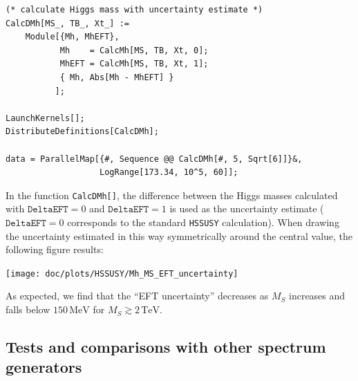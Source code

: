 \documentclass[final,3p,11pt,pdflatex]{elsarticle}
\makeatletter
\newcommand{\modelname}[1]{\texttt{#1}\@\xspace}
\newcommand{\HSSUSY}{\modelname{HSSUSY}}
\newcommand{\code}[1]{\lstinline|#1|}  %
\newcommand{\unit}[1]{\,\text{#1}}      %
\newcommand{\MS}{\ensuremath{M_S}\xspace}
\makeatother
\begin{document}
\begin{example}[label=ex:HSSUSY_EFT_uncertainty]
\begin{lstlisting}
(* calculate Higgs mass with uncertainty estimate *)
CalcDMh[MS_, TB_, Xt_] :=
    Module[{Mh, MhEFT},
           Mh    = CalcMh[MS, TB, Xt, 0];
           MhEFT = CalcMh[MS, TB, Xt, 1];
           { Mh, Abs[Mh - MhEFT] }
          ];

LaunchKernels[];
DistributeDefinitions[CalcDMh];

data = ParallelMap[{#, Sequence @@ CalcDMh[#, 5, Sqrt[6]]}&,
                   LogRange[173.34, 10^5, 60]];
\end{lstlisting}%
%
In the function \code{CalcDMh[]}, the difference between the Higgs masses
calculated with $\texttt{DeltaEFT} = 0$ and $\texttt{DeltaEFT} =
1$ is used as the uncertainty estimate ($\texttt{DeltaEFT} =
0$ corresponds to the standard \HSSUSY calculation).  When drawing the
uncertainty estimated in this way symmetrically around the central
value, the following figure results:
%
\begin{center}
  \texttt{[image: doc/plots/HSSUSY/Mh\_MS\_EFT\_uncertainty]}
\end{center}
%
As expected, we find that the ``EFT uncertainty'' decreases as
$\MS$ increases and falls below $150\unit{MeV}$ for $\MS \gtrsim 2\unit{TeV}$.
\end{example}

\subsection{Tests and comparisons with other spectrum generators}
\end{document}

